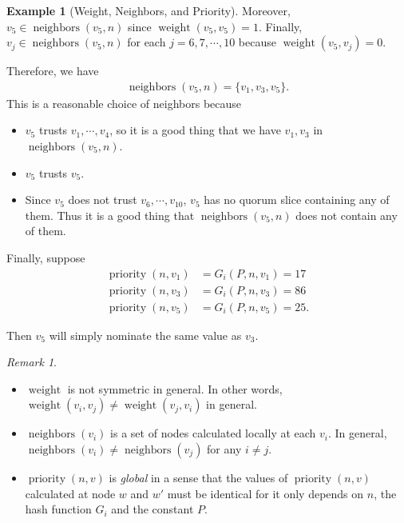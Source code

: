 \documentclass[12pt, psamsfonts]{amsart}
\theoremstyle{definition}
\newtheorem{exmp}[thm]{Example}
\theoremstyle{remark}
\newtheorem{rem}[thm]{Remark}
\DeclareMathOperator{\weight}{weight}
\DeclareMathOperator{\neighbors}{neighbors}
\DeclareMathOperator{\priority}{priority}
\numberwithin{equation}{subsection}
\begin{document}
\begin{exmp}[Weight, Neighbors, and Priority]
    Moreover, $v_5 \in \neighbors(v_5, n)$ since $\weight(v_5, v_5) = 1$.
    Finally, $v_j \in \neighbors(v_5, n)$ for each $j = 6, 7, \cdots, 10$ because $\weight(v_5, v_j) = 0$.

    Therefore, we have
    \begin{align*}
        \neighbors(v_5, n) = \{ v_1, v_3, v_5 \}.
    \end{align*}
    This is a reasonable choice of neighbors because
    \begin{itemize}
        \item
            $v_5$ trusts $v_1, \cdots, v_4$, so it is a good thing that we have $v_1, v_3$ in $\neighbors(v_5, n)$.
        \item
            $v_5$ trusts $v_5$.
        \item
            Since $v_5$ does not trust $v_6, \cdots, v_{10}$, $v_5$ has no quorum slice containing any of them.
            Thus it is a good thing that $\neighbors(v_5, n)$ does not contain any of them.
    \end{itemize}

    Finally, suppose
    \begin{align*}
        \priority(n, v_1) &= G_i(P, n, v_1) = 17 \\
        \priority(n, v_3) &= G_i(P, n, v_3) = 86 \\
        \priority(n, v_5) &= G_i(P, n, v_5) = 25.
    \end{align*}

    Then $v_5$ will simply nominate the same value as $v_3$.
\end{exmp}

\begin{rem}
    $ $
    \begin{itemize}
        \item
            $\weight$ is not symmetric in general.
            In other words, $\weight(v_i, v_j) \ne \weight(v_j, v_i)$ in general.
        \item
            $\neighbors(v_i)$ is a set of nodes calculated locally at each $v_i$.
            In general, $\neighbors(v_i) \ne \neighbors(v_j)$ for any $i \ne j$.
        \item
            $\priority(n, v)$ is \textit{global} in a sense that the values of $\priority(n, v)$ calculated at node $w$ and $w'$ must be identical for it only depends on $n$, the hash function $G_i$ and the constant $P$.
    \end{itemize}
\end{rem}
\end{document}

